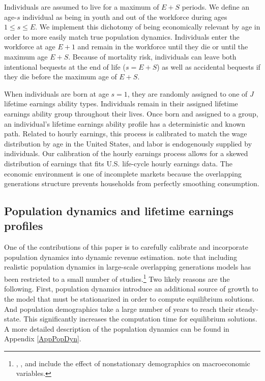 \documentclass[letterpaper,12pt]{article}
\theoremstyle{definition}
\begin{document}
\begin{spacing}{1.5}
  Individuals are assumed to live for a maximum of $E+S$ periods. We define an age-$s$ individual as being in youth and out of the workforce during ages $1\leq s\leq E$. We implement this dichotomy of being economically relevant by age in order to more easily match true population dynamics. Individuals enter the workforce at age $E+1$ and remain in the workforce until they die or until the maximum age $E+S$. Because of mortality risk, individuals can leave both intentional bequests at the end of life ($s=E+S$) as well as accidental bequests if they die before the maximum age of $E+S$.

  When individuals are born at age $s=1$, they are randomly assigned to one of $J$ lifetime earnings ability types. Individuals remain in their assigned lifetime earnings ability group throughout their lives. Once born and assigned to a group, an individual's lifetime earnings ability profile has a deterministic and known path. Related to hourly earnings, this process is calibrated to match the wage distribution by age in the United States, and labor is endogenously supplied by individuals. Our calibration of the hourly earnings process allows for a skewed distribution of earnings that fits U.S. life-cycle hourly earnings data. The economic environment is one of incomplete markets because the overlapping generations structure prevents households from perfectly smoothing consumption.


  \subsection{Population dynamics and lifetime earnings profiles}\label{SecPopDyn}

    One of the contributions of this paper is to carefully calibrate and incorporate population dynamics into dynamic revenue estimation. \citet{NishiyamaSmetters:2007} note that including realistic population dynamics in large-scale overlapping generations models has been restricted to a small number of studies.\footnote{\citet{DeNardiEtAl:1999}, \citet{KotlikoffEtAl:2001}, and \citet{Nishiyama:2004} include the effect of nonstationary demographics on macroeconomic variables.} Two likely reasons are the following. First, population dynamics introduce an additional source of growth to the model that must be stationarized in order to compute equilibrium solutions. And population demographics take a large number of years to reach their steady-state. This significantly increases the computation time for equilibrium solutions. A more detailed description of the population dynamics can be found in Appendix \ref{AppPopDyn}.


\end{spacing}
\end{document}
